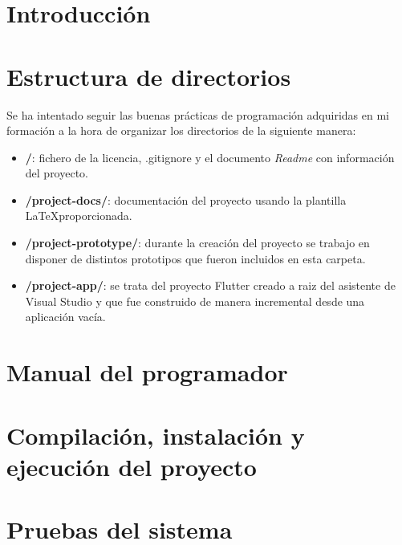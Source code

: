 
\section{Introducción}

\section{Estructura de directorios}
Se ha intentado seguir las buenas prácticas de programación adquiridas en mi formación a la hora de organizar los directorios de la siguiente manera:
\begin{itemize}
	
	\item \textbf{/}: fichero de la licencia, .gitignore y el documento \textit{Readme} con información del proyecto.
	
	\item \textbf{/project-docs/}: documentación del proyecto usando la plantilla \LaTeX  proporcionada.
	
	\item \textbf{/project-prototype/}: durante la creación del proyecto se trabajo en disponer de distintos prototipos que fueron incluidos en esta carpeta.
	
	\item \textbf{/project-app/}: se trata del proyecto Flutter creado a raiz del asistente de Visual Studio y que fue construido de manera incremental desde una aplicación vacía.
	
	
\end{itemize}

\section{Manual del programador}

\section{Compilación, instalación y ejecución del proyecto}

\section{Pruebas del sistema}
